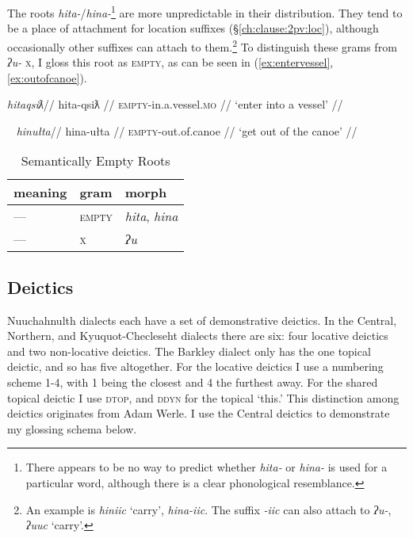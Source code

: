 The roots \textit{hita-}/\textit{hina-}\footnote{There appears to be no way to predict whether \textit{hita-} or \textit{hina-} is used for a particular word, although there is a clear phonological resemblance.} are more unpredictable in their distribution. They tend to be a place of attachment for location suffixes (\S\ref{ch:clause:2pv:loc}), although occasionally other suffixes can attach to them.\footnote{An example is \textit{hiniic} `carry', \textit{hina-iic}. The suffix \textit{-iic} can also attach to \textit{ʔu-}, \textit{ʔuuc} `carry'.} To distinguish these grams from \textit{ʔu-} \textsc{x}, I gloss this root as \textsc{empty}, as can be seen in (\ref{ex:entervessel}, \ref{ex:outofcanoe}).

\ex \label{ex:entervessel}
\begingl
\glpreamble \textit{hitaqsiƛ}//
\gla hita-qsiƛ //
\glb \textsc{empty}-in.a.vessel.\textsc{mo} //
\glft `enter into a vessel' //
\endgl
\xe

\ex~ \label{ex:outofcanoe}
\begingl
\glpreamble \textit{hinułta}//
\gla hina-ułta //
\glb \textsc{empty}-out.of.canoe //
\glft `get out of the canoe' //
\endgl
\xe

\begin{table}[ht]
\centering
\caption{Semantically Empty Roots}
\label{table:augdim}
\begin{tabular}{lll}
meaning                            & gram               & morph                                         \\ \hline
\multicolumn{1}{|l|}{---} & \multicolumn{1}{l|}{\textsc{empty}}   & \multicolumn{1}{l|}{\textit{hita}, \textit{hina}}                   \\ \hline
\multicolumn{1}{|l|}{---} & \multicolumn{1}{l|}{\textsc{x}}   & \multicolumn{1}{l|}{\textit{ʔu}}                   \\ \hline
\end{tabular}
\end{table}

\subsection{Deictics}

Nuuchahnulth dialects each have a set of demonstrative deictics. In the Central, Northern, and Kyuquot-Checleseht dialects there are six: four locative deictics and two non-locative deictics. The Barkley dialect only has the one topical deictic, and so has five altogether. For the locative deictics I use a numbering scheme 1-4, with 1 being the closest and 4 the furthest away. For the shared topical deictic I use \textsc{dtop}, and \textsc{ddyn} for the topical `this.' This distinction among deictics originates from Adam Werle. I use the Central deictics to demonstrate my glossing schema below.

